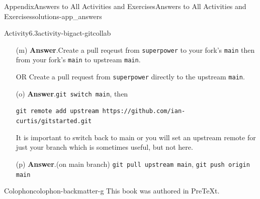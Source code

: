 \documentclass[oneside,10pt,]{book}
\newcommand{\blocktitlefont}{\relax}
\newcommand{\xreffont}{\relax}
\newcommand{\mono}[1]{\texttt{#1}}
\providecommand\phantomsection{}
\begin{document}
\begin{solutions-chapter}{Appendix}{Answers to All Activities and Exercises}{}{Answers to All Activities and Exercises}{}{}{solutions-app_answers}
\begin{activitysolution}{Activity}{6.3}{}{activity-bigact-gitcollab}
\begin{enumerate}[font=\bfseries,label=(\alph*),ref=\alph*]
\item[(m)]\noindent\textbf{\blocktitlefont Answer}.\hypertarget{answer-bigact-gitcollab-n-b-back}{}\quad{}Create a pull reqeust from \mono{superpower} to your fork's \mono{main} then from your fork's \mono{main} to upstream \mono{main}.%
\par
OR Create a pull request from \mono{superpower} directly to the upstream \mono{main}.%
\item[(o)]\noindent\textbf{\blocktitlefont Answer}.\hypertarget{answer-bigact-gitcollab-p-b-back}{}\quad{}\mono{git switch main}, then%
\par
\mono{git remote add upstream https://github.com/ian-curtis/gitstarted.git}%
\par
It is important to switch back to main or you will set an upstream remote for just your branch which is sometimes useful, but not here.%
\item[(p)]\noindent\textbf{\blocktitlefont Answer}.\hypertarget{answer-bigact-gitcollab-q-b-back}{}\quad{}(on main branch) \mono{git pull upstream main}, \mono{git push origin main}%
\end{enumerate}%
\end{activitysolution}%
\end{solutions-chapter}
%
\backmatter%
%
\clearpage\phantomsection%
%
%
{\xreffont\printindex}
%
\clearpage
\pagestyle{empty}
\begin{backcolophon}{Colophon}{colophon-backmatter-g}%
This book was authored in PreTeXt.%
\end{backcolophon}%
\end{document}
